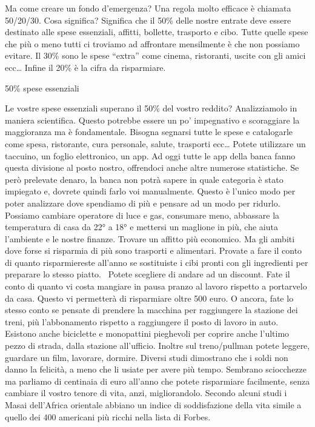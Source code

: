 \documentclass[12pt]{book} %
\begin{document}
\bigskip

Ma come creare un fondo d'emergenza? Una regola molto efficace è chiamata 50/20/30. Cosa significa?
Significa che il 50\% delle nostre entrate deve essere destinato alle spese essenziali, affitti, bollette, trasporto e
cibo. Tutte quelle spese che più o meno tutti ci troviamo ad affrontare mensilmente è che non possiamo evitare. Il 30\%
sono le spese “extra” come cinema, ristoranti, uscite con gli amici ecc… Infine il 20\% è la cifra da risparmiare.


\bigskip

50\% spese essenziali

Le vostre spese essenziali superano il 50\% del vostro reddito? Analizziamolo in maniera scientifica. Questo potrebbe
essere un po' impegnativo e scoraggiare la maggioranza ma è fondamentale. Bisogna segnarsi tutte
le spese e catalogarle come spesa, ristorante, cura personale, salute, trasporti ecc… Potete utilizzare un taccuino, un
foglio elettronico, un app. Ad oggi tutte le app della banca fanno questa divisione al posto nostro, offrendoci anche
altre numerose statistiche. Se però prelevate denaro, la banca non potrà sapere in quale categoria è stato impiegato e,
dovrete quindi farlo voi manualmente. Questo è l'unico modo per poter analizzare dove spendiamo di
più e pensare ad un modo per ridurlo. Possiamo cambiare operatore di luce e gas, consumare meno, abbassare la
temperatura di casa da 22° a 18° e mettersi un maglione in più, che aiuta l'ambiente e le nostre
finanze. Trovare un affitto più economico. Ma gli ambiti dove forse si risparmia di più sono trasporti e alimentari.
Provate a fare il conto di quanto risparmiereste all'anno se sostituiste i cibi pronti con gli
ingredienti per preparare lo stesso piatto. \ Potete scegliere di andare ad un discount. Fate il conto di quanto vi
costa mangiare in pausa pranzo al lavoro rispetto a portarvelo da casa. Questo vi permetterà di risparmiare oltre 500
euro. O ancora, fate lo stesso conto se pensate di prendere la macchina per raggiungere la stazione dei treni, più
l'abbonamento rispetto a raggiungere il posto di lavoro in auto. Esistono anche biciclette e
monopattini pieghevoli per coprire anche l'ultimo pezzo di strada, dalla stazione
all'ufficio. Inoltre sul treno/pullman potete leggere, guardare un film, lavorare, dormire.
Diversi studi dimostrano che i soldi non danno la felicità, a meno che li usiate per avere più tempo. Sembrano
sciocchezze ma parliamo di centinaia di euro all'anno che potete risparmiare facilmente, senza
cambiare il vostro tenore di vita, anzi, migliorandolo. Secondo alcuni studi i Masai dell'Africa
orientale abbiano un indice di soddisfazione della vita simile a quello dei 400 americani più ricchi nella lista di
Forbes.
\end{document}
